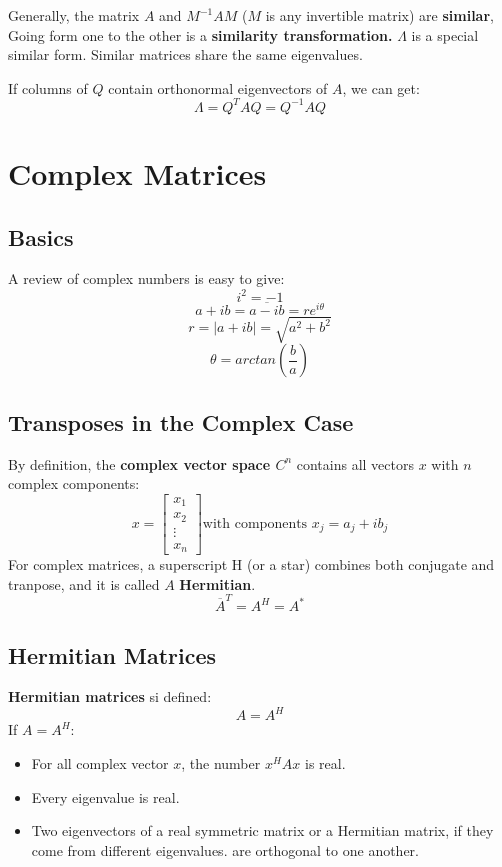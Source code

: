 \documentclass[10pt,a4paper,oneside]{article}
\begin{document}
Generally, the matrix $A$ and $M^{-1}AM$ ($M$ is any invertible matrix) are {\bfseries similar}, Going form one to the other is a {\bfseries similarity transformation.} $\Lambda$ is a special similar form. Similar matrices share the same eigenvalues. 


If columns of $Q$ contain orthonormal eigenvectors of $A$, we can get:
\[
\Lambda = Q^TAQ=Q^{-1}AQ
\]
\section{Complex Matrices}
\subsection{Basics}
A review of complex numbers is easy to give:
\[
i^2=-1
\]
\[
a+i b=\overline{a-i b}=r e^{i \theta}
\]
\[
r = |a+ib| = \sqrt{a^2+b^2}
\]
\[
\theta=arctan(\frac{b}{a})
\]
\subsection{Transposes in the Complex Case}
By definition, the {\bfseries complex vector space $C^n$} contains all vectors $x$ with $n$ complex components:
$$
x=\left[\begin{array}{c}{x_{1}} \\ {x_{2}} \\ {\vdots} \\ {x_{n}}\end{array}\right] \text{with components } x_j = a_j + ib_j
$$
For complex matrices, a superscript H (or a star) combines both conjugate and tranpose, and it is called $A$ {\bfseries Hermitian}.
\[
\overline{A}^T=A^H=A^*
\]
\subsection{Hermitian Matrices}
{\bfseries Hermitian matrices} si defined:
\[
A=A^H
\]
If $A=A^H$:
\begin{itemize}
\item For all complex vector $x$, the number $x^HAx$ is real.
\item Every eigenvalue is real.
\item Two eigenvectors of a real symmetric matrix or a Hermitian matrix, if they come from different eigenvalues. are orthogonal to one another.
\end{itemize}
\end{document}
